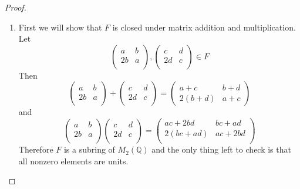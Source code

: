 \documentclass[10pt]{article}
\newcommand{\bb}[1]{\mathbb{#1}}
\theoremstyle{plain}
\theoremstyle{remark}
\begin{document}
\begin{proof}
  \begin{enumerate}
  \item First we will show that $F$ is closed under matrix addition
    and multiplication. Let \[
      \left(
        \begin{array}{cc}
          a&b\\
          2b&a\\
        \end{array}
      \right),
      \left(
        \begin{array}{cc}
          c&d\\
          2d&c\\
        \end{array}
      \right)\in F\]
    Then
    \[
      \left(
        \begin{array}{cc}
          a&b\\
          2b&a\\
        \end{array}
      \right)+
      \left(
        \begin{array}{cc}
          c&d\\
          2d&c\\
        \end{array}
      \right)
      = 
      \left(
        \begin{array}{cc}
          a+c&b+d\\
          2(b+d)&a+c
        \end{array}
      \right)
    \]
    and
    \[
      \left(
        \begin{array}{cc}
          a&b\\
          2b&a\\
        \end{array}
      \right)
      \left(
        \begin{array}{cc}
          c&d\\
          2d&c\\
        \end{array}
      \right)
      = 
      \left(
        \begin{array}{cc}
          ac+2bd&bc+ad\\
          2(bc+ad)&ac+2bd\\
        \end{array}
      \right)
    \]
    Therefore $F$ is a subring of $M_2(\bb{Q})$ and the only thing left to
    check is that all nonzero elements are units.


\end{enumerate}
\end{proof}
\end{document}

